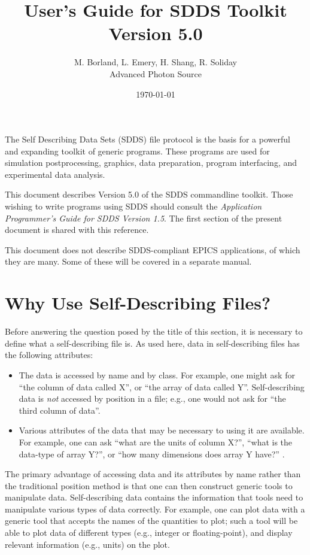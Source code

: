\documentclass[11pt]{article}
\begin{document}
\title{User's Guide for SDDS Toolkit Version 5.0}
\author{M. Borland, L. Emery, H. Shang, R. Soliday\\Advanced Photon Source\\ \date{\today}}
\maketitle

The Self Describing Data Sets (SDDS) file protocol is the basis for a
powerful and expanding toolkit of generic programs. These
programs are used for simulation postprocessing, graphics, data
preparation, program interfacing, and experimental data analysis.

This document describes Version 5.0 of the SDDS commandline toolkit.
Those wishing to write programs using SDDS should consult the {\em
Application Programmer's Guide for SDDS Version 1.5}\cite{SDDS_AP1.5}.
The first section of the present document is shared with this
reference.

This document does not describe SDDS-compliant EPICS applications, of
which they are many. Some of these will be covered in a separate
manual.

\section{Why Use Self-Describing Files?}

Before answering the question posed by the title of this section, it
is necessary to define what a self-describing file is.  As used here,
data in self-describing files has the following attributes:
\begin{itemize}
\item The data is accessed by name and by class.  For example, one
 might ask for ``the column of data called X'', or ``the array of data
 called Y''.  Self-describing data is {\em not} accessed by position
 in a file; e.g., one would not ask for ``the third column of data''.
\item Various attributes of the data that may be necessary to using it
 are available.  For example, one can ask ``what are the units of
 column X?'', ``what is the data-type of array Y?'', or ``how many
 dimensions does array Y have?'' .
\end{itemize}

The primary advantage of accessing data and its attributes by name
rather than the traditional position method is that one can then
construct generic tools to manipulate data. Self-describing data
contains the information that tools need to manipulate various types
of data correctly.  For example, one can plot data with a generic tool
that accepts the names of the quantities to plot; such a tool will be
able to plot data of different types (e.g., integer or
floating-point), and display relevant information (e.g., units) on the
plot.
\end{document}
